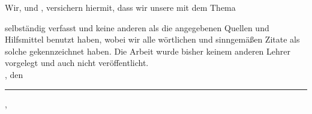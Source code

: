 \clearpage
{}


Wir, \autorNameTwo{} und \autorNameOne{}, versichern hiermit, dass wir unsere \textbf{\betreff} mit dem
Thema
\begin{quote}
\textit{\kompletterTitel}
\end{quote}
selbständig verfasst und keine anderen als die angegebenen Quellen und Hilfsmittel benutzt haben,
wobei wir alle wörtlichen und sinngemäßen Zitate als solche gekennzeichnet haben. Die Arbeit
wurde bisher keinem anderen Lehrer vorgelegt und auch nicht veröffentlicht.\\[6ex]

\abgabeOrt, den \abgabeTermin


\rule[-0.2cm]{5.5cm}{0.5pt}

\textsc{\autorNameOne, \autorNameTwo}
